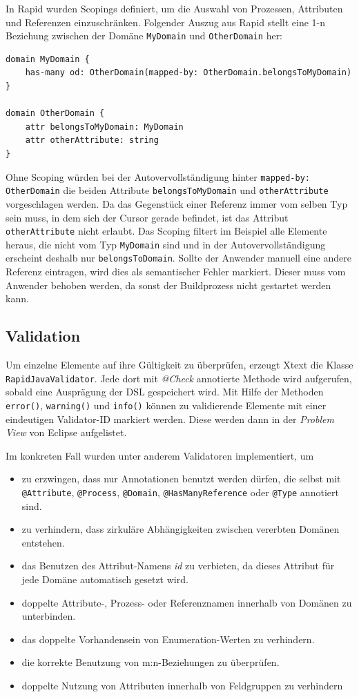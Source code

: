\documentclass[a4paper,12pt]{scrreprt}
\begin{document}
In Rapid wurden Scopings definiert, um die Auswahl von Prozessen, Attributen und Referenzen einzuschränken. 
Folgender Auszug aus Rapid stellt eine 1-n Beziehung zwischen der Domäne \verb+MyDomain+ und \verb+OtherDomain+ her:
\begin{verbatim}
domain MyDomain {
    has-many od: OtherDomain(mapped-by: OtherDomain.belongsToMyDomain)
}

domain OtherDomain {
    attr belongsToMyDomain: MyDomain
    attr otherAttribute: string
}
\end{verbatim}

Ohne Scoping würden bei der Autovervollständigung hinter \verb+mapped-by: OtherDomain+ die beiden Attribute \verb+belongsToMyDomain+ und \verb+otherAttribute+ vorgeschlagen werden.
Da das Gegenstück einer Referenz immer vom selben Typ sein muss, in dem sich der Cursor gerade befindet, ist das Attribut \verb+otherAttribute+ nicht erlaubt. Das Scoping filtert im Beispiel alle Elemente heraus, die nicht vom Typ \verb+MyDomain+ sind und in der Autovervollständigung erscheint deshalb nur \verb+belongsToDomain+.
Sollte der Anwender manuell eine andere Referenz eintragen, wird dies als semantischer Fehler markiert. Dieser muss vom Anwender behoben werden, da sonst der Buildprozess nicht gestartet werden kann.
\subsection{Validation}
Um einzelne Elemente auf ihre Gültigkeit zu überprüfen, erzeugt Xtext die Klasse \verb+RapidJavaValidator+. Jede dort mit \textit{@Check} annotierte Methode wird aufgerufen, sobald eine Ausprägung der DSL gespeichert wird.
Mit Hilfe der Methoden \verb+error()+, \verb+warning()+ und \verb+info()+ können zu validierende Elemente mit einer eindeutigen Validator-ID markiert werden. Diese werden dann in der \emph{Problem View} von Eclipse aufgelistet.

Im konkreten Fall wurden unter anderem Validatoren implementiert, um
\begin{itemize}
	\item zu erzwingen, dass nur Annotationen benutzt werden dürfen, die selbst mit \verb+@Attribute+, \verb+@Process+, \verb+@Domain+, \verb+@HasManyReference+ oder \verb+@Type+ annotiert sind.
	\item zu verhindern, dass zirkuläre Abhängigkeiten zwischen vererbten Domänen entstehen.
	\item das Benutzen des Attribut-Namens \textit{id} zu verbieten, da dieses Attribut für jede Domäne automatisch gesetzt wird.
	\item doppelte Attribute-, Prozess- oder Referenznamen innerhalb von Domänen zu unterbinden.
	\item das doppelte Vorhandensein von Enumeration-Werten zu verhindern.
	\item die korrekte Benutzung von m:n-Beziehungen zu überprüfen.
	\item doppelte Nutzung von Attributen innerhalb von Feldgruppen zu verhindern
\end{itemize}
\end{document}
